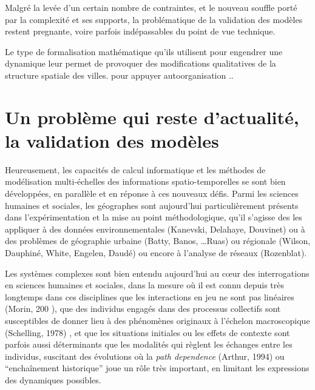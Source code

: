 

Malgré la levée d'un certain nombre de contraintes, et le nouveau souffle porté par la complexité et ses supports, la problématique de la validation des modèles restent pregnante, voire parfois indépassables du point de vue technique.  \autocite[296]{Batty1976} 

Le type de formalisation mathématique qu'ils utilisent pour engendrer une dynamique leur permet de provoquer des modifications qualitatives de la structure spatiale des villes. \autocite{pumain1984} pour appuyer autoorganisation ..

\section{Un problème qui reste d'actualité, la validation des modèles}
\label{sec:constante_problematique}

Heureusement, les capacités de calcul informatique et les méthodes de modélisation multi-échelles des informations spatio-temporelles se sont bien développées, en parallèle et en réponse à ces nouveaux défis. Parmi les sciences humaines et sociales, les géographes sont aujourd'hui particulièrement présents dans l’expérimentation et la mise au point méthodologique, qu’il s’agisse des les appliquer à des données environnementales (Kanevski, Delahaye, Douvinet) ou à des problèmes de géographie urbaine (Batty, Banos, …Ruas) ou régionale (Wilson, Dauphiné, White, Engelen, Daudé) ou encore à l’analyse de réseaux (Rozenblat). 

Les systèmes complexes sont bien entendu aujourd'hui au cœur des interrogations en sciences humaines et sociales, dans la mesure où il est connu depuis très longtemps dans ces disciplines que les interactions en jeu ne sont pas linéaires   (Morin, 200 ), que des individus engagés dans des processus collectifs sont susceptibles de donner lieu à des phénomènes originaux à l’échelon macroscopique (Schelling, 1978) , et que les situations initiales ou les effets de contexte sont parfois aussi déterminants que les modalités qui règlent les échanges entre les individus, suscitant des évolutions où la \textit{path dependence}  (Arthur, 1994) ou \enquote{enchaînement historique} joue un rôle très important, en limitant les expressions des dynamiques possibles.

